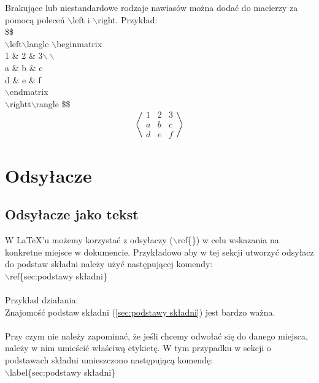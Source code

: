 \documentclass[a4paper, 12pt]{article}
\begin{document}
Brakujące lub niestandardowe rodzaje nawiasów można dodać do macierzy za pomocą poleceń $\backslash$left i $\backslash$right. Przykład: \\
\$\$ \\
$\backslash$left$\backslash$langle
$\backslash$begin{matrix} \\
1 \& 2 \& 3$\backslash\backslash$ \\
a \& b \& c \\
d \& e \& f \\
$\backslash$end{matrix} \\
$\backslash$rightt$\backslash$rangle
\$\$ \\

$$
\left\langle
\begin{matrix}
1 & 2 & 3\\
a & b & c\\
d & e & f
\end{matrix}
\right\rangle
$$

\section{Odsyłacze}
\subsection{Odsyłacze jako tekst}

W \LaTeX 'u możemy korzystać z odsyłaczy ($\backslash$ref\{\}) w celu wskazania na konkretne miejsce w dokumencie. Przykładowo aby w tej sekcji utworzyć odsyłacz do podstaw składni należy użyć następującej komendy: \\
$\backslash$ref\{sec:podstawy składni\} \\
\\
Przykład działania: \\
Znajomość podstaw składni (\ref{sec:podstawy składni}) jest bardzo ważna. \\
\\
Przy czym nie należy zapominać, że jeśli chcemy odwołać się do danego miejsca, należy w nim umieścić właściwą etykietę. W tym przypadku w sekcji o podstawach składni umieszczono następującą komendę: \\
$\backslash$label\{sec:podstawy składni\}
\end{document}
